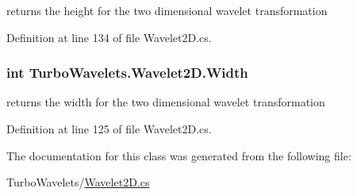 returns the height for the two dimensional wavelet transformation 



\-Definition at line 134 of file \-Wavelet2\-D.\-cs.

\hypertarget{class_turbo_wavelets_1_1_wavelet2_d_a30058c5e0e5bd95b29bc080efbcf9083}{
\subsubsection[{\-Width}]{\setlength{\rightskip}{0pt plus 5cm}int {\bf \-Turbo\-Wavelets.\-Wavelet2\-D.\-Width}}}\label{class_turbo_wavelets_1_1_wavelet2_d_a30058c5e0e5bd95b29bc080efbcf9083}


returns the width for the two dimensional wavelet transformation 



\-Definition at line 125 of file \-Wavelet2\-D.\-cs.



\-The documentation for this class was generated from the following file\-:\begin{DoxyCompactItemize}
\item 
\-Turbo\-Wavelets/\hyperlink{_wavelet2_d_8cs}{\-Wavelet2\-D.\-cs}\end{DoxyCompactItemize}
